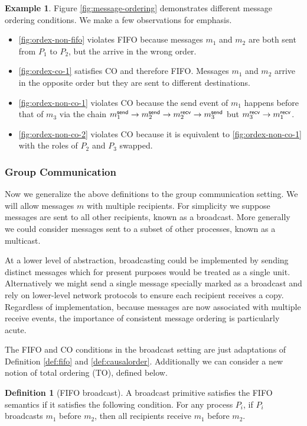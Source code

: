 \documentclass[]             %
{NASA}                       %
\theoremstyle{definition}
\newtheorem{example}{Example}[section]
\newtheorem{definition}{Definition}[section]
\providecommand{\tightlist}{%
  \setlength{\itemsep}{0pt}\setlength{\parskip}{0pt}}
\begin{document}
\begin{example}
Figure \ref{fig:message-ordering} demonstrates different message
ordering conditions. We make a few observations for emphasis.

\begin{itemize}
  \tightlist
\item \ref{fig:ordex-non-fifo} violates FIFO because messages $m_1$
  and $m_2$ are both sent from $P_1$ to $P_2$, but the arrive in the wrong order.
\item \ref{fig:ordex-co-1} satisfies CO and therefore FIFO. Messages
  $m_1$ and $m_2$ arrive in the opposite order but they are sent to
  different destinations.
\item \ref{fig:ordex-non-co-1} violates CO because the send event of
  $m_1$ happens before that of $m_3$ via the chain
  $m_{1}^{\mathsf{send}} \to m_{2}^{\mathsf{send}} \to m_{2}^{\mathsf{recv}} \to m_{3}^{\mathsf{send}}$ but
  $m_{3}^{\mathsf{recv}} \to m_{1}^{\mathsf{recv}}$.
\item \ref{fig:ordex-non-co-2} violates CO because it is equivalent to
  \ref{fig:ordex-non-co-1} with the roles of $P_2$ and $P_3$ swapped.
\end{itemize}
\end{example}

\subsubsection{Group Communication}
Now we generalize the above definitions to the group communication
setting. We will allow messages $m$ with multiple recipients. For
simplicity we suppose messages are sent to all other recipients, known
as a broadcast. More generally we could consider messages sent to a
subset of other processes, known as a multicast.

At a lower level of abstraction, broadcasting could be implemented by
sending distinct messages which for present purposes would be treated
as a single unit. Alternatively we might send a single message
specially marked as a broadcast and rely on lower-level network
protocols to ensure each recipient receives a copy. Regardless of
implementation, because messages are now associated with multiple
receive events, the importance of consistent message ordering is
particularly acute.

The FIFO and CO conditions in the broadcast setting are just
adaptations of Definition \ref{def:fifo} and
\ref{def:causalorder}. Additionally we can consider a new notion of
total ordering (TO), defined below.

\begin{definition}[FIFO broadcast]
  \label{def:fifo-bcast}
  A broadcast primitive satisfies the FIFO semantics if it satisfies
  the following condition. For any process $P_i$, if $P_i$ broadcasts
  $m_1$ before $m_2$, then all recipients receive $m_1$ before $m_2$.
\end{definition}
\end{document}
